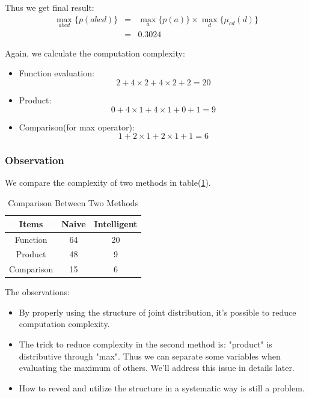 \documentclass[11pt,a4paper]{article}
\begin{document}
Thus we get final result:
\begin{eqnarray}
\max_{abcd} \{ p(abcd) \} &=& \max_{a} \{ p(a) \} \times \max_{d}\{\mu_{cd}(d)\} \\
&=& 0.3024 
\end{eqnarray}

Again, we calculate the computation complexity:
\begin{itemize}
	\item Function evaluation: 
	$$
	2 + 4 \times 2 + 4 \times 2 + 2 = 20
	$$
	\item Product: 
	$$
	0 + 4 \times 1 + 4 \times 1 + 0 + 1 = 9
	$$
	\item Comparison(for max operator): 
	$$
	1 + 2 \times 1 + 2 \times 1 + 1 = 6
	$$
\end{itemize}

\subsubsection{Observation}


We compare the complexity of two methods in table(\ref{tbl:toy_cmp}). 

\begin{table}[htb]
\centering
	\caption{Comparison Between Two Methods}
	\label{tbl:toy_cmp}
	\begin{tabular}{c|cc}
	\hline
	Items & Naive & Intelligent \\
	\hline
	Function & 64 & 20 \\
	Product & 48 & 9 \\
	Comparison & 15 & 6 \\
	\hline
	\end{tabular}
\end{table}

The observations:
\begin{itemize}
	\item By properly using the structure of joint distribution, 
	it's possible to reduce computation complexity.
	\item The trick to reduce complexity in the second method is:
	"product" is distributive through "max". Thus we can 
	separate some variables when evaluating the maximum of 
	others. We'll address this issue in details later.   
	\item How to reveal and utilize the structure in a 
	systematic way is still a problem. 
\end{itemize}
\end{document}
